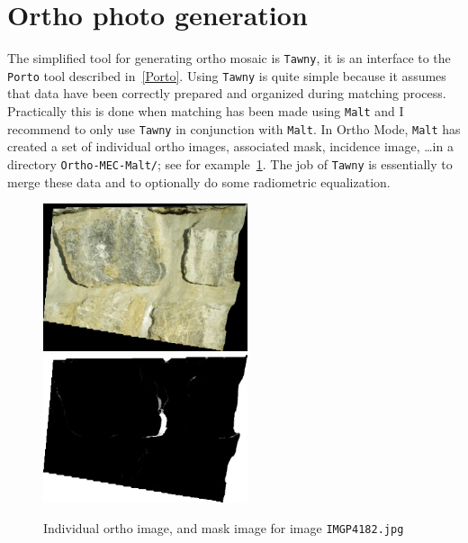 
\section{Ortho photo generation}

The simplified tool for generating ortho mosaic is {\tt Tawny}, it is
an interface to the {\tt Porto} tool described in~\ref{Porto}.
Using {\tt Tawny} is quite simple because it assumes that data have been correctly prepared and organized during matching
process. Practically this is done when matching has been made using
{\tt Malt} and I recommend to only use {\tt Tawny} in conjunction with
{\tt Malt}. In Ortho Mode, {\tt Malt} has created a set of
individual ortho images, associated mask, incidence image, \dots in
a directory {\tt Ortho-MEC-Malt/}; see for example~\ref{FIG:Malt:Input}.
 The job of {\tt Tawny} is essentially to merge these data and to optionally do some
radiometric equalization.



\begin{figure}
\begin{center}
\includegraphics[width=60mm]{FIGS/MurSaintMartin/Ort_IMGP4182.jpg}
\includegraphics[width=60mm]{FIGS/MurSaintMartin/PC_IMGP4182.jpg}
\end{center}
\caption{Individual ortho image, and mask image for image {\tt IMGP4182.jpg}}
\label{FIG:Malt:Input}
\end{figure}




